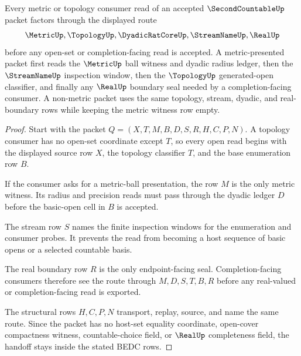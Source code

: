 \begin{theorem}
\label{thm:second-countable-metric-base-handoff}
Every metric or topology consumer read of an accepted $\SecondCountableUp$ packet factors through the displayed route
$$
\MetricUp,\TopologyUp,\DyadicRatCoreUp,\StreamNameUp,\RealUp
$$
before any open-set or completion-facing read is accepted. A metric-presented packet first reads the $\MetricUp$ ball witness and dyadic radius ledger, then the $\StreamNameUp$ inspection window, then the $\TopologyUp$ generated-open classifier, and finally any $\RealUp$ boundary seal needed by a completion-facing consumer. A non-metric packet uses the same topology, stream, dyadic, and real-boundary rows while keeping the metric witness row empty.
\end{theorem}
\begin{proof}
Start with the packet $Q=(X,T,M,B,D,S,R,H,C,P,N)$. A topology consumer has no open-set coordinate except $T$, so every open read begins with the displayed source row $X$, the topology classifier $T$, and the base enumeration row $B$.

If the consumer asks for a metric-ball presentation, the row $M$ is the only metric witness. Its radius and precision reads must pass through the dyadic ledger $D$ before the basic-open cell in $B$ is accepted.

The stream row $S$ names the finite inspection windows for the enumeration and consumer probes. It prevents the read from becoming a host sequence of basic opens or a selected countable basis.

The real boundary row $R$ is the only endpoint-facing seal. Completion-facing consumers therefore see the route through $M,D,S,T,B,R$ before any real-valued or completion-facing read is exported.

The structural rows $H,C,P,N$ transport, replay, source, and name the same route. Since the packet has no host-set equality coordinate, open-cover compactness witness, countable-choice field, or $\RealUp$ completeness field, the handoff stays inside the stated BEDC rows.
\end{proof}


